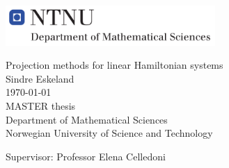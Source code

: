 
\thispagestyle{empty}
\includegraphics[height=0.6in]{fig/rams}
\mbox{}\\[6pc]
\begin{center}
\Huge{Projection methods for linear Hamiltonian systems}\\[2pc]

\Large{Sindre Eskeland}\\[1pc]
\large{\today}\\[2pc]

MASTER thesis\\
Department of Mathematical Sciences\\
Norwegian University of Science and Technology
\end{center}
\vfill

\noindent Supervisor: Professor Elena Celledoni


